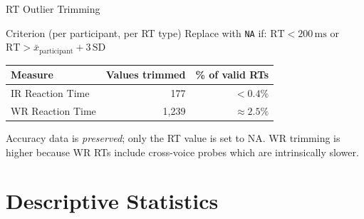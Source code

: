\documentclass[aspectratio=169, 10pt]{beamer}
\begin{document}
\begin{frame}{RT Outlier Trimming}
  \begin{block}{Criterion (per participant, per RT type)}
    Replace with \texttt{NA} if: $\text{RT} < 200\,\text{ms}$
    \quad or \quad $\text{RT} > \bar{x}_\text{participant} + 3\,\text{SD}$ 
  \end{block}
  \vspace{0.8em}
  \begin{center}
    \begin{tabular}{lrr}
      \toprule
      Measure & Values trimmed & \% of valid RTs \\
      \midrule
      IR Reaction Time & 177  & $<0.4\%$ \\
      WR Reaction Time & 1{,}239 & $\approx2.5\%$  \\
      \bottomrule
    \end{tabular}
  \end{center}
  \vspace{0.5em}
  \small Accuracy data is \emph{preserved}; only the RT value is set to NA.
  WR trimming is higher because WR RTs include cross-voice probes
  which are intrinsically slower.
\end{frame}

\section{Descriptive Statistics}
\end{document}
